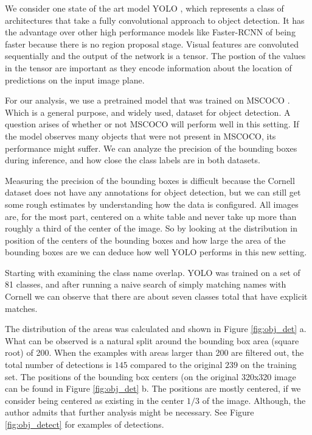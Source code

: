 \documentclass{article}
\begin{document}
We consider one state of the art model YOLO \cite{redmon16}, which represents a class
of architectures that take a fully convolutional approach to object detection. It has
the advantage over other high performance models like Faster-RCNN \cite{girshick15} of
being faster because there is no region proposal stage. Visual features are convoluted
sequentially and the output of the network is a tensor. The postion of the values in the
tensor are important as they encode information about the location of predictions on the
input image plane.

For our analysis, we use a pretrained model that was trained on MSCOCO \cite{lin14}. Which
is a general purpose, and widely used, dataset for object detection. A question arises of
whether or not MSCOCO will perform well in this setting. If the model
observes many objects that were not present in MSCOCO, its performance might suffer.
We can analyze the precision of the bounding boxes during inference, and how close
the class labels are in both datasets.

Measuring the precision of the bounding boxes is difficult because the Cornell dataset
does not have any annotations for object detection, but we can still get some rough
estimates by understanding
how the data is configured. All images are, for the most part, centered on a white table
and never take up more than roughly a third of the center of the image. So by looking
at the distribution in position of the centers of the bounding boxes and how large the
area of the bounding boxes are we can deduce how well YOLO performs in this new setting.

Starting with examining the class name overlap. YOLO was trained on a set of 81 classes,
and after running a naive search of simply matching names with Cornell we can observe
that there are about seven classes total that have explicit matches.

The distribution of the areas was calculated and shown in Figure \ref{fig:obj_det} a.
What can be observed is a natural split around the bounding box area (square root) of
200. When the examples with areas larger than 200 are filtered out, the total number
of detections is $145$ compared to the original $239$ on the training set. The positions
of the bounding box centers (on the original 320x320 image can be found in Figure
\ref{fig:obj_det} b. The positions are mostly centered, if we consider being centered
as existing in the center $1/3$ of the image. Although, the author admits
that further analysis might be necessary. See Figure \ref{fig:obj_detect} for examples
of detections.
\end{document}
